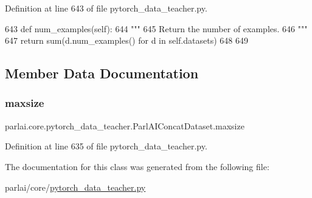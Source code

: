 Definition at line 643 of file pytorch\+\_\+data\+\_\+teacher.\+py.


\begin{DoxyCode}
643     \textcolor{keyword}{def }num\_examples(self):
644         \textcolor{stringliteral}{"""}
645 \textcolor{stringliteral}{        Return the number of examples.}
646 \textcolor{stringliteral}{        """}
647         \textcolor{keywordflow}{return} sum(d.num\_examples() \textcolor{keywordflow}{for} d \textcolor{keywordflow}{in} self.datasets)
648 
649 
\end{DoxyCode}


\subsection{Member Data Documentation}
\mbox{\label{classparlai_1_1core_1_1pytorch__data__teacher_1_1ParlAIConcatDataset_a431fa0b54c4f0d63911c8bcaf73b8ffc}} 
\subsubsection{\texorpdfstring{maxsize}{maxsize}}
{\footnotesize\ttfamily parlai.\+core.\+pytorch\+\_\+data\+\_\+teacher.\+Parl\+A\+I\+Concat\+Dataset.\+maxsize\hspace{0.3cm}{\ttfamily [static]}}



Definition at line 635 of file pytorch\+\_\+data\+\_\+teacher.\+py.



The documentation for this class was generated from the following file\+:\begin{DoxyCompactItemize}
\item 
parlai/core/\hyperlink{pytorch__data__teacher_8py}{pytorch\+\_\+data\+\_\+teacher.\+py}\end{DoxyCompactItemize}
